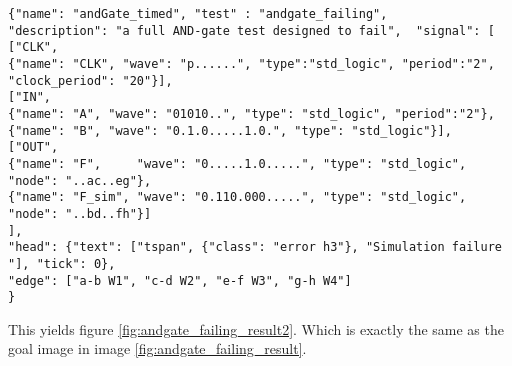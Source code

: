 \begin{lstlisting}[style=json, caption={Final content of the result file of a failing AND-gate example}, label={json:andgate_failing_result}]
{"name": "andGate_timed", "test" : "andgate_failing", 
"description": "a full AND-gate test designed to fail",  "signal": [
["CLK",
{"name": "CLK", "wave": "p......", "type":"std_logic", "period":"2", "clock_period": "20"}],
["IN",
{"name": "A", "wave": "01010..", "type": "std_logic", "period":"2"},
{"name": "B", "wave": "0.1.0.....1.0.", "type": "std_logic"}],
["OUT",
{"name": "F",     "wave": "0.....1.0.....", "type": "std_logic", "node": "..ac..eg"},
{"name": "F_sim", "wave": "0.110.000.....", "type": "std_logic", "node": "..bd..fh"}]
], 
"head": {"text": ["tspan", {"class": "error h3"}, "Simulation failure "], "tick": 0}, 
"edge": ["a-b W1", "c-d W2", "e-f W3", "g-h W4"]
}
\end{lstlisting}\nline
This yields figure \ref{fig:andgate_failing_result2}.
\nline
Which is exactly the same as the goal image in image \ref{fig:andgate_failing_result}.

